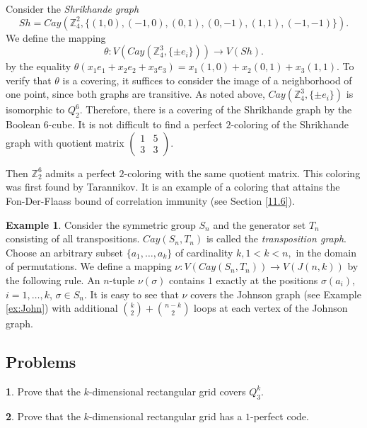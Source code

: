 \documentclass[11pt]{article}
\theoremstyle{definition}
\newtheorem{exercise}{\quad}
\newtheorem{example}{Example}[section]
\begin{document}
{{{Consider the  {\sl  Shrikhande graph} 
$$Sh=Cay(\mathbb{Z}^2_4,\{(1,0),(-1,0),(0,1),(0,-1),(1,1),(-1,-1)\}).$$
We define the mapping \[\theta: V(Cay(\mathbb{Z}^3_4,\{\pm e_i\}))\rightarrow V(Sh).\] by the equality $\theta(x_1 e_1+x_2 e_2+x_3
e_3)=x_1(1,0)+x_2(0,1)+x_3(1,1)$.
To  verify that $\theta$ is a
covering, it  suffices to consider the image of a neighborhood of one
point, since both graphs are transitive. As noted above, $Cay(\mathbb{Z}^3_4,\{\pm
e_i\})$ is isomorphic to $Q^6_2$. Therefore, there is a
covering of the Shrikhande graph by the Boolean $6$-cube. It is not difficult to find a perfect $2$-coloring of the Shrikhande graph with
quotient matrix
$\begin{pmatrix}
1 & 5 \\
3 & 3
\end{pmatrix}$.

Then  $\mathbb{Z}^6_2$ admits a perfect $2$-coloring with the same quotient matrix.
This coloring was first found by Tarannikov. {It is an example of a
coloring that attains the Fon-Der-Flaass bound
of correlation immunity (see Section \ref{11.6}).}

\begin{example}\label{ex:trans_graph}
Consider the symmetric group $S_n$ and the generator set $T_n$ consisting of all transpositions.  $Cay(S_n,T_n)$ is called the {\sl transposition graph}.
Choose an arbitrary subset $\{a_1,\dots,a_k\}$ of cardinality $k,
1<k<n,$ in the domain of  permutations. We define
a mapping $\nu: V(Cay(S_n,T_n))\rightarrow V(J(n,k))$ by the following rule.
An $n$-tuple $\nu(\sigma)$ contains $1$  exactly at the positions $\sigma(a_i)$,
$i=1,\dots,k$, $\sigma\in S_n$. It is easy to see that 
$\nu$ covers the  Johnson graph (see Example
\ref{ex:John}) with additional ${k \choose 2} + {n-k \choose 2}$
loops at each
vertex of the Johnson graph. %
\end{example}


\subsection{Problems}

\begin{exercise}
Prove that the $k$-dimensional rectangular grid covers 
$Q^k_3$.
\end{exercise}


\begin{exercise}
Prove that the $k$-dimensional rectangular grid has a $1$-perfect
code.
\end{exercise}



}}}
\end{document}
